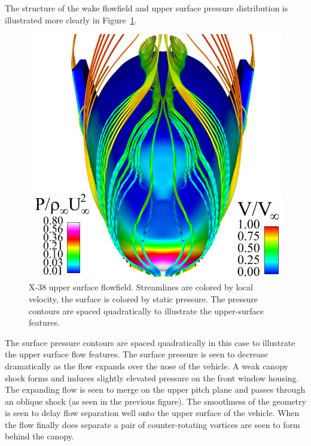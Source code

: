 The structure of the wake flowfield and upper surface pressure distribution is illustrated more clearly in Figure~\ref{fig:x38_flow2}.
\begin{figure}[hbtp]
  \begin{center}
    \includegraphics[width=.8\textwidth]{figures/x38/press}
    \caption[X-38 upper surface flowfield.]{X-38 upper surface flowfield. Streamlines are colored by local velocity, the surface is colored by static pressure.  The pressure contours are spaced quadratically to illustrate the upper-surface features.\label{fig:x38_flow2}}
  \end{center}
\end{figure}
The surface pressure contours are spaced quadratically in this case to illustrate the upper surface flow features.  The surface pressure is seen to decrease dramatically as the flow expands over the nose of the vehicle.  A weak canopy shock forms and induces slightly elevated pressure on the front window housing.  The expanding flow is seen to merge on the upper pitch plane and passes through an oblique shock (as seen in the previous figure).  The smoothness of the geometry is seen to delay flow separation well onto the upper surface of the vehicle.  When the flow finally does separate a pair of counter-rotating vortices are seen to form behind the canopy.


